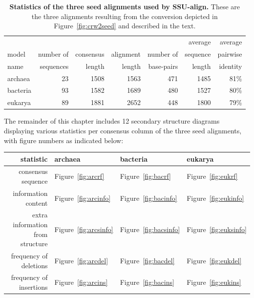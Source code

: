 \begin{table}
\begin{center}
\begin{tabular}{lrrrrrr} \hline
        &           &           &           &           & average   & average  \\
model   & number of & consensus & alignment & number of & sequence  & pairwise \\
name    & sequences & length    & length    & base-pairs & length    & identity \\ \hline
archaea & 23        & 1508      & 1563      & 471       & 1485      & 81\%     \\
bacteria& 93        & 1582      & 1689      & 480       & 1527      & 80\%     \\
eukarya  & 89       & 1881      & 2652      & 448       & 1800      & 79\%     \\ 
\end{tabular}
\caption[Statistics of the three seed alignments used by SSU-align.]
{\textbf{Statistics of the three seed alignments used by
    SSU-align.} These are the three alignments resulting from the
     conversion depicted in Figure~\ref{fig:crw2seed} and
    described in the text.}
\label{tbl:finalseeds}
\end{center}
\end{table}

The remainder of this chapter includes 12 secondary structure diagrams
displaying various statistics per consensus column of the three seed
alignments, with figure numbers as indicated below:

\vspace{0.2in}

\begin{tabular}{r|l|l|l} \hline
statistic                        & archaea & bacteria & eukarya \\ \hline
consensus sequence               & Figure~\ref{fig:arcrf}  & Figure~\ref{fig:bacrf} & Figure~\ref{fig:eukrf} \\ 
information content              & Figure~\ref{fig:arcinfo} & Figure~\ref{fig:bacinfo} & Figure~\ref{fig:eukinfo} \\ 
extra information from structure & Figure~\ref{fig:arcsinfo} & Figure~\ref{fig:bacsinfo} & Figure~\ref{fig:euksinfo} \\ 
frequency of deletions           & Figure~\ref{fig:arcdel} & Figure~\ref{fig:bacdel} & Figure~\ref{fig:eukdel} \\ 
frequency of insertions          & Figure~\ref{fig:arcins} & Figure~\ref{fig:bacins} & Figure~\ref{fig:eukins} \\ 
\end{tabular}

